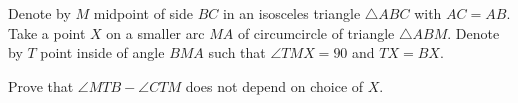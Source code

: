 Denote by $ M$ midpoint of side $ BC$ in an isosceles triangle $ \triangle ABC$ with $ AC = AB$. Take a point $ X$ on a smaller arc ${MA}$ of circumcircle of triangle $ \triangle ABM$. Denote by $ T$ point inside of angle $ BMA$ such that $ \angle TMX = 90$ and $ TX = BX$.

Prove that $ \angle MTB - \angle CTM$ does not depend on choice of $ X$.
